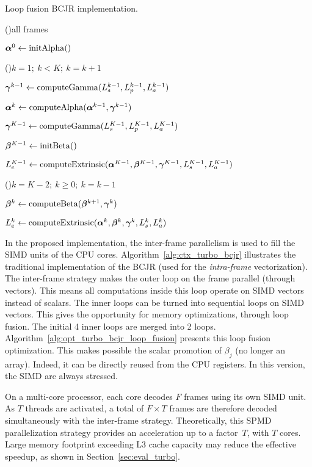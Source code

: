 \begin{algorithm}
  \caption{Loop fusion BCJR implementation.}
  \label{alg:opt_turbo_bcjr_loop_fusion}

  \For(){all frames}
  {
    $\boldsymbol{\alpha}^0\gets \operatorname*{initAlpha}()$

    \For(){$k=1;~k<K;~k=k+1$}
    {
      $\boldsymbol{\gamma}^{k-1}\gets \operatorname*{computeGamma}(L_{s}^{k-1}, L_{p}^{k-1}, L_{a}^{k-1})$

      $\boldsymbol{\alpha}^k\gets \operatorname*{computeAlpha}(\boldsymbol{\alpha}^{k-1}, \boldsymbol{\gamma}^{k-1})$
    }

    $\boldsymbol{\gamma}^{K-1}\gets \operatorname*{computeGamma}(L_{s}^{K-1}, L_{p}^{K-1}, L_{a}^{K-1})$

    $\boldsymbol{\beta}^{K-1}\gets \operatorname*{initBeta}()$

    $L_e^{K-1}\gets \operatorname*{computeExtrinsic}(\boldsymbol{\alpha}^{K-1}, \boldsymbol{\beta}^{K-1}, \boldsymbol{\gamma}^{K-1}, L_{s}^{K-1}, L_{a}^{K-1})$

    \For(){$k=K-2;~k \geq 0;~k=k-1$}
    {
      $\boldsymbol{\beta}^k\gets \operatorname*{computeBeta}(\boldsymbol{\beta}^{k+1}, \boldsymbol{\gamma}^{k})$

      $L_e^{k}\gets \operatorname*{computeExtrinsic}(\boldsymbol{\alpha}^{k}, \boldsymbol{\beta}^k, \boldsymbol{\gamma}^{k}, L_{s}^{k}, L_{a}^{k})$
    }
  }
\end{algorithm}

In the proposed implementation, the inter-frame parallelism is used to fill the
SIMD units of the CPU cores. Algorithm~\ref{alg:ctx_turbo_bcjr} illustrates the
traditional implementation of the BCJR (used for the \emph{intra-frame}
vectorization). The inter-frame strategy makes the outer loop on the frame
parallel (through vectors). This means all computations inside this loop operate
on SIMD vectors instead of scalars. The inner loops can be turned into
sequential loops on SIMD vectors. This gives the opportunity for memory
optimizations, through loop fusion. The initial 4 inner loops are merged into 2
loops. Algorithm~\ref{alg:opt_turbo_bcjr_loop_fusion} presents this loop fusion
optimization. This makes possible the scalar promotion of $\beta_j$ (no longer
an array). Indeed, it can be directly reused from the CPU registers. In this
version, the SIMD are always stressed.

On a multi-core processor, each core decodes $F$ frames using its own SIMD unit.
As $T$ threads are activated, a total of $F\times T$ frames are therefore
decoded simultaneously with the inter-frame strategy. Theoretically, this SPMD
parallelization strategy provides an acceleration up to a factor~$T$, with $T$
cores. Large memory footprint exceeding L3 cache capacity may reduce the
effective speedup, as shown in Section~\ref{sec:eval_turbo}.

